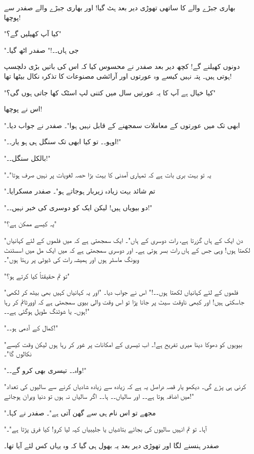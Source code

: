 بھاری جبڑے والے کا ساتھی تھوڑی دیر بعد ہٹ گیا! اور بھاری جبڑے والے صفدر سے پوچھا!

"کیا آپ کھیلیں گے؟"

"جی ہاں۔۔!" صفدر اٹھ گیا۔

دونوں کھیلنے گے! کچھ دیر بعد صفدر نے محسوس کیا کہ اس کی باتیں بڑی دلچسپ ہوتی ہیں۔ پتہ نہیں کیسے وہ عورتوں اور آرائشی مصنوعات کا تذکرہ نکال بیٹھا تھا!

"کیا خیال ہے آپ کا یہ عورتیں سال میں کتنی لپ اسٹک کھا جاتی ہوں گی؟"

اس نے پوچھا!

"ابھی تک میں عورتوں کے معاملات سمجھنے کے قابل نہیں ہوا"۔ صفدر نے جواب دیا۔

"اوہو۔۔ تو کیا ابھی تک سنگل ہی ہو یار۔۔!"

"بالکل سنگل۔۔!"

"یہ تو بہت بری بات ہے کہ تمہاری آمدنی کا بہت بڑا حصہ لغویات پر نہیں صرف ہوتا"۔

"تم شائد بہت زیادہ زیربار ہوجاتے ہو"۔ صفدر مسکرایا۔

"دو بیویاں ہیں! لیکن ایک کو دوسری کی خبر نہیں۔۔!"

"یہ کیسے ممکن ہے؟"

"دن ایک کے ہاں گزرتا ہے، رات دوسری کے ہاں"۔ ایک سمجھتی ہے کہ میں فلموں کے لئے کہانیاں لکھتا ہوں! وہی جس کے ہاں رات بسر ہوتی ہے۔ اور دوسری سمجھتی ہے کہ میں ایک مل میں اسسٹنٹ ویونگ ماسٹر ہوں اور ہمیشہ رات کی ڈیوٹی پر رہتا ہوں"۔

"تو تم حقیقتاً کیا کرتے ہو؟"

"فلموں کے لئے کہانیاں لکھتا ہوں۔۔!" اس نے جواب دیا۔ "اور یہ کہانیاں کہیں بھی بیٹھ کر لکھی جاسکتی ہیں! اور کبھی ناوقت سیٹ پر جانا پڑا تو اس وقت والی بیوی سمجھتی ہے کہ اوورٹائم کر رہا ہوں۔ یا شوٹنگ طویل ہوگئی ہے۔۔!"

"کمال کے آدمی ہو۔۔!"

"بیویوں کو دھوکا دینا میری تفریح ہے!۔ اب تیسری کے امکانات پر غور کر رہا ہوں لیکن وقت کیسے نکالوں گا"۔

"واہ۔۔ تیسری بھی کرو گے۔۔!"

"کرنی ہی پڑے گی۔ دیکھو یار قصہ دراصل یہ ہے کہ زیادہ سے زیادہ شادیاں کرنے سے سالیوں کی تعداد میں اضافہ ہوتا ہے۔۔ اور سالیاں۔۔ ہا۔۔ اگر سالیاں نہ ہوں تو دنیا ویران ہوجائے!"

"مجھے تو اس نام ہی سے گھن آتی ہے"۔ صفدر نے کہا۔

"آہا۔ تو تم انہیں سالیوں کی بجائے بتاشیاں یا جلیبیاں کہہ لیا کرو! کیا فرق پڑتا ہے"۔

صفدر ہنسنے لگا اور تھوڑی دیر بعد یہ بھول ہی گیا کہ وہ یہاں کس لئے آیا تھا۔

